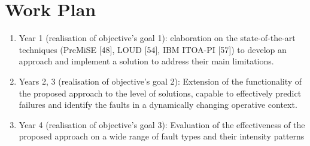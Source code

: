 \documentclass[]{usiinfprospectus}
\begin{document}
\section{Work Plan}
\begin{enumerate}
   \item Year 1 (realisation of objective's goal 1): elaboration on the state-of-the-art techniques (PreMiSE [48], LOUD [54], IBM ITOA-PI [57]) to develop an approach and implement a solution to address their main limitations. 
   \item Years 2, 3 (realisation of objective's goal 2): Extension of the functionality of the proposed approach to the level of solutions, capable to effectively predict failures and identify the faults in a dynamically changing operative context.
   \item Year 4 (realisation of objective's goal 3):  Evaluation of the effectiveness of the proposed approach on a wide range of fault types and their intensity patterns
\end{enumerate}

\nocite{*}


\end{document}
